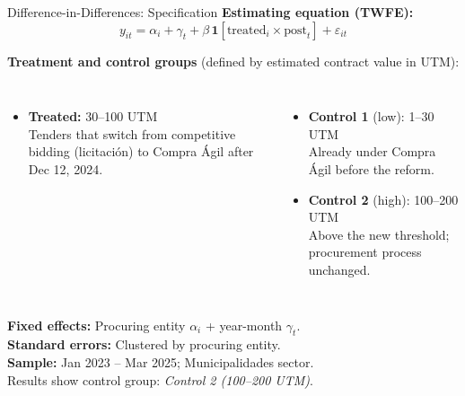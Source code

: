\documentclass[9pt,aspectratio=169]{beamer}
\begin{document}
\begin{frame}{Difference-in-Differences: Specification}
\textbf{Estimating equation (TWFE):}
\[
  y_{it} = \alpha_i + \gamma_t + \beta\,\mathbf{1}[\text{treated}_i \times \text{post}_t] + \varepsilon_{it}
\]

\medskip
\textbf{Treatment and control groups} (defined by estimated contract value in UTM):
\begin{columns}[T]
  \begin{itemize}
    \item \textbf{Treated:} 30--100 UTM \\
          \small Tenders that switch from competitive bidding (licitación)
          to Compra Ágil after Dec 12, 2024.
  \end{itemize}
  \begin{itemize}
    \item \textbf{Control 1} (low): 1--30 UTM \\
          \small Already under Compra Ágil before the reform.
    \item \textbf{Control 2} (high): 100--200 UTM \\
          \small Above the new threshold; procurement process unchanged.
  \end{itemize}
\end{columns}

\medskip
\textbf{Fixed effects:} Procuring entity $\alpha_i$ + year-month $\gamma_t$.\\
\textbf{Standard errors:} Clustered by procuring entity.\\
\textbf{Sample:} Jan 2023 -- Mar 2025; Municipalidades sector.\\[4pt]
\small Results show control group: \textit{Control 2 (100--200 UTM)}.
\end{frame}
\end{document}
